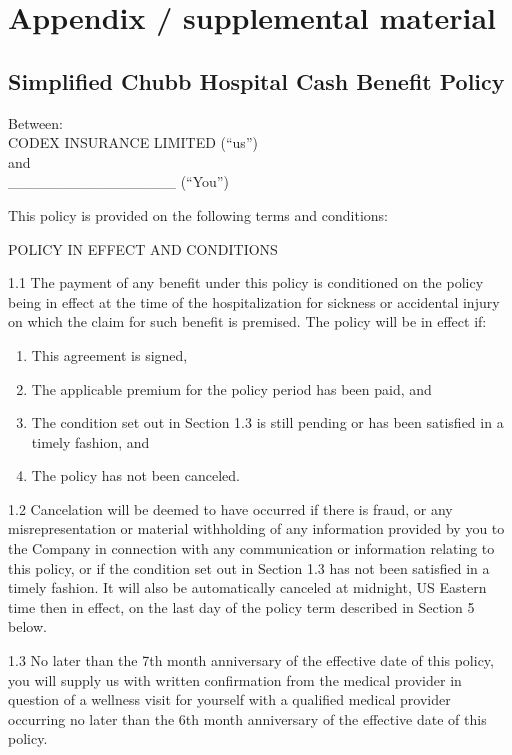 \appendix

\onecolumn

\section{Appendix / supplemental material}

\subsection{Simplified Chubb Hospital Cash Benefit Policy}
\label{app:simplified_chubb}
\noindent Between:\\
CODEX INSURANCE LIMITED (\textquotedblleft us\textquotedblright)\\
and\\
\_\_\_\_\_\_\_\_\_\_\_\_\_\_\_\_ (\textquotedblleft You\textquotedblright)

\vspace{1em}
This policy is provided on the following terms and conditions:

POLICY IN EFFECT AND CONDITIONS

1.1 The payment of any benefit under this policy is conditioned on the policy being in effect at the time of the hospitalization for sickness or accidental injury on which the claim for such benefit is premised. The policy will be in effect if:
\begin{enumerate}%
    \item This agreement is signed, 
    \item The applicable premium for the policy period has been paid, and
    \item The condition set out in Section 1.3 is still pending or has been satisfied in a timely fashion, and
    \item The policy has not been canceled.
\end{enumerate}

1.2 Cancelation will be deemed to have occurred if there is fraud, or any misrepresentation or material withholding of any information provided by you to the Company in connection with any communication or information relating to this policy, or if the condition set out in Section 1.3 has not been satisfied in a timely fashion. It will also be automatically canceled at midnight, US Eastern time then in effect, on the last day of the policy term described in Section 5 below.

1.3 No later than the 7th month anniversary of the effective date of this policy, you will supply us with written confirmation from the medical provider in question of a wellness visit for yourself with a qualified medical provider occurring no later than the 6th month anniversary of the effective date of this policy.

